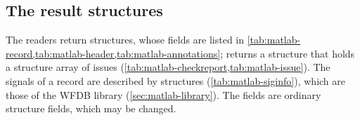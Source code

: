 \subsection{The result structures}
\label{sec:matlab-results}

The readers return structures, whose fields are listed in
\cref{tab:matlab-record,tab:matlab-header,tab:matlab-annotations};
 returns a structure that holds a structure array of issues
(\cref{tab:matlab-checkreport,tab:matlab-issue}). The signals of a record are described by
 structures (\cref{tab:matlab-siginfo}), which are those of the WFDB
library (\cref{sec:matlab-library}). The fields are ordinary structure fields, which may
be changed.

